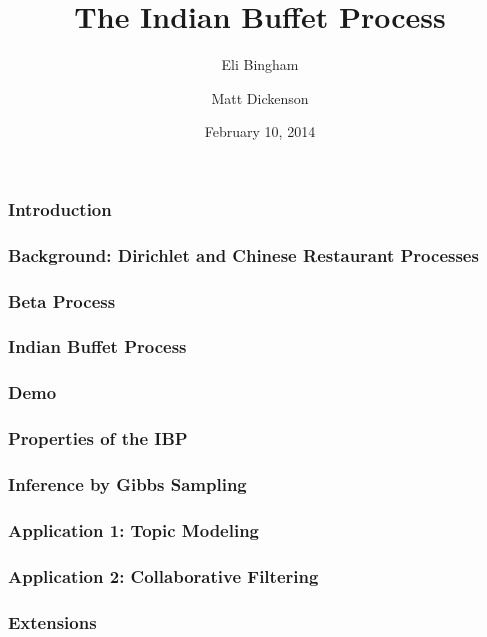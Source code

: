 \documentclass[13pt]{beamer}
\title[Indian Buffet Process]{The Indian Buffet Process}
\author[Bingham and Dickenson]{Eli Bingham
 \and
 Matt Dickenson}
\date{February 10, 2014}
\begin{document}
\begin{frame}
\titlepage
\end{frame}
\begin{frame}
\frametitle{Introduction}
\end{frame}
\begin{frame}
\frametitle{Background: Dirichlet and Chinese Restaurant Processes}
\end{frame}
\begin{frame}
\frametitle{Beta Process}
\end{frame}
\begin{frame}
\frametitle{Indian Buffet Process}
\end{frame}
\begin{frame}
\frametitle{Demo}
\end{frame}
\begin{frame}
\frametitle{Properties of the IBP}
\end{frame}
\begin{frame}
\frametitle{Inference by Gibbs Sampling}
\end{frame}
\begin{frame}
\frametitle{Application 1: Topic Modeling}
\end{frame}
\begin{frame}
\frametitle{Application 2: Collaborative Filtering}
\end{frame}
\begin{frame}
\frametitle{Extensions}
\end{frame}
 
\end{document}
